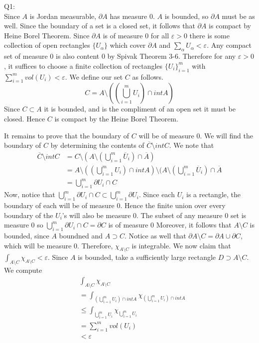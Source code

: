 \documentclass[letterpaper]{article}
\newcommand{\ol}{\overline}
\begin{document}
Q1:\\ 
Since $A$ is Jordan measurable, $\partial A$ has measure 0. $A$ is bounded, so $\partial A$ must be as well. Since the boundary of a set is a closed set, it follows that
$\partial A$ is compact by Heine Borel Theorem. Since $\partial A$ is of measure 0 for all $\varepsilon>0$ there is some collection of open rectangles $\{ U_\alpha\}$ which cover $\partial A$ and $\sum_\alpha U_\alpha<\varepsilon$. 
Any compact set of measure 0 is also content 0 by Spivak Theorem 3-6. Therefore for any $\varepsilon>0$, it suffices to choose a finite collection of rectangles $\{U_i\}_{i=1}^m$ with $\sum_{i=1}^m vol(U_i)< \varepsilon$. 
We define our set $C$ as follows. $$C= A\setminus ((\bigcup_{i=1}^m U_i )\cap int A)$$ Since $C\subset A$ it is bounded, and is the compliment of an open set it must be closed. Hence $C$ is compact by the Heine Borel Theorem. 
\par It remains to prove that the boundary of $C$ will be of measure 0. We will find the boundary of $C$ by determining the contents of $\ol C \setminus intC$. We note that 
\begin{align*}
    \ol C \setminus int C  & = C \setminus (A \setminus (\bigcup_{i=1}^m \ol U_i)\cap \ol A )
    \\ & = A\setminus ((\bigcup_{i=1}^m U_i )\cap int A) \setminus (A \setminus (\bigcup_{i=1}^m \ol U_i)\cap \ol A
    \\ & = \bigcup_{i=1}^m \partial U_i \cap C
\end{align*}
Now, notice that $\bigcup_{i=1}^m \partial U_i \cap C \subset \bigcup_{i=1}^m \partial U_i$. Since each $U_i$ is a rectangle, the boundary of each will be of measure 0. Hence the finite union over every boundary of the $U_i$'s will also be measure 0. The subset of any measure 0 set is measure 0 so $\bigcup_{i=1}^m \partial U_i \cap C = \partial C$ is of measure 0
Moreover, it follows that $A\setminus C$ is bounded, since $A$ boundned and $A\supset C$. Notice as well that $\partial A\setminus C = \partial A \cup \partial C$, which will be measure 0. Therefore, $\chi_{A\setminus C}$ is integrable.  We now claim that $\int_{A\setminus C} \chi_{A\setminus C} < \varepsilon$. Since $A$ is bounded, take a sufficiently large rectangle $D\supset A\setminus C$. We compute 
\begin{align*}
    & \int_{A\setminus C} \chi_{A\setminus C}
    \\ & = \int_{(\bigcup_{i=1}^m U_i )\cap int A} \chi_{(\bigcup_{i=1}^m U_i )\cap int A} \tag{using the definition of C}
    \\ & \leq \int_{\bigcup_{i=1}^m U_i} \chi_{\bigcup_{i=1}^m U_i} \tag{by A7Q3}
    \\ & = \sum_{i=1}^m vol(U_i) \tag{by defintion of volume}
    \\ & < \varepsilon
\end{align*}
\end{document}
